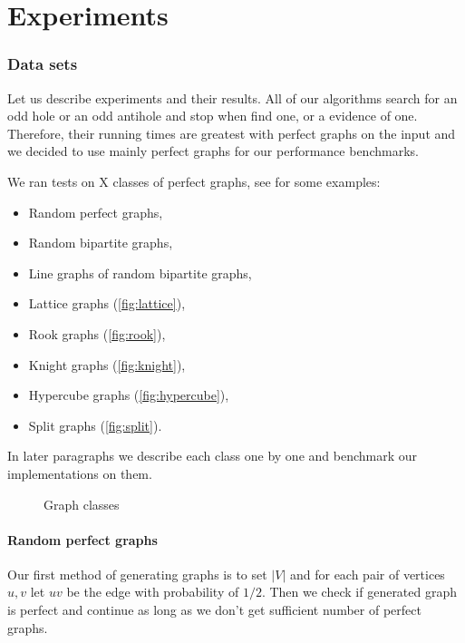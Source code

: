\section{Experiments}
\label{sec:experiments}

\subsubsection{Data sets}

Let us describe experiments and their results. All of our algorithms search for an odd hole or an odd antihole and stop when find one, or a evidence of one. Therefore, their running times are greatest with perfect graphs on the input and we decided to use mainly perfect graphs for our performance benchmarks.

We ran tests on X classes of perfect graphs, see  for some examples:
\begin{itemize}
  \item Random perfect graphs,
  \item Random bipartite graphs,
  \item Line graphs of random bipartite graphs,
  \item Lattice graphs (\cref{fig:lattice}),
  \item Rook graphs (\cref{fig:rook}),
  \item Knight graphs (\cref{fig:knight}),
  \item Hypercube graphs (\cref{fig:hypercube}),
  \item Split graphs (\cref{fig:split}).
\end{itemize}

In later paragraphs we describe each class one by one and benchmark our implementations on them.

\begin{figure}
  
  \caption{Graph classes}
  \label{fig:graphClasses}
\end{figure}

\paragraph{Random perfect graphs}
Our first method of generating graphs is to set $|V|$ and for each pair of vertices $u, v$ let $uv$ be the edge with probability of $1/2$. Then we check if generated graph is perfect and continue as long as we don't get sufficient number of perfect graphs.

